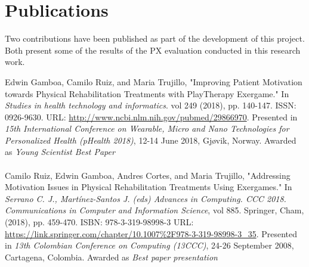 

\chapter*{Publications} %

Two contributions have been published as part of the development of this project. Both present some of the results of the \ac{PX} evaluation conducted in this research work.

\bigskip

\noindent Edwin Gamboa, Camilo Ruiz, and Maria Trujillo, "Improving Patient Motivation towards Physical Rehabilitation Treatments with PlayTherapy Exergame." In \textit{Studies in health technology and informatics}. vol 249 (2018), pp. 140-147. ISSN: 0926-9630. URL: \url{http://www.ncbi.nlm.nih.gov/pubmed/29866970}. Presented in \textit{15th International Conference on Wearable, Micro and Nano Technologies for Personalized Health (pHealth 2018)}, 12-14 June 2018, Gjøvik, Norway. Awarded as \textit{Young Scientist Best Paper}
\\\\
Camilo Ruiz, Edwin Gamboa, Andres Cortes, and Maria Trujillo, "Addressing Motivation Issues in Physical Rehabilitation Treatments Using Exergames." In \textit{Serrano C. J., Martínez-Santos J. (eds) Advances in Computing. CCC 2018. Communications in Computer and Information Science}, vol 885. Springer, Cham, (2018), pp. 459-470. ISBN: 978-3-319-98998-3 URL: \url{https://link.springer.com/chapter/10.1007\%2F978-3-319-98998-3_35}. Presented in \textit{13th Colombian Conference on Computing (13CCC)}, 24-26 September 2008, Cartagena, Colombia. Awarded as \textit{Best paper presentation}